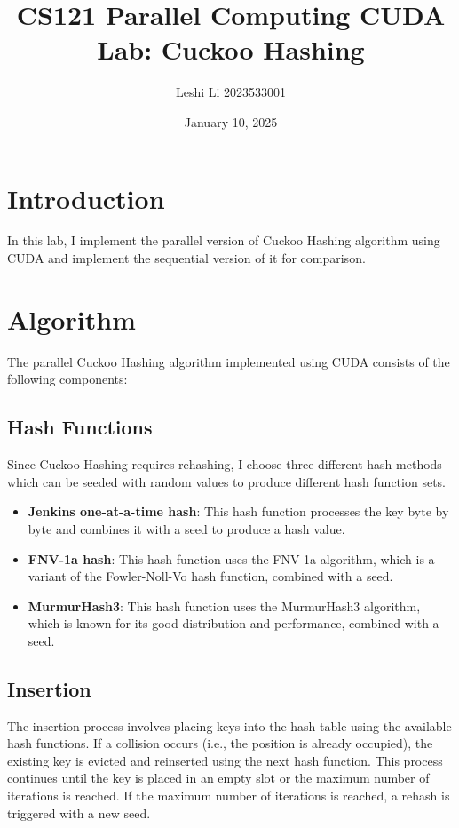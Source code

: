 \documentclass{article}
\title{CS121 Parallel Computing CUDA Lab: Cuckoo Hashing}
\author{Leshi Li 2023533001}
\date{January 10, 2025}
\begin{document}
\maketitle

\section{Introduction}

In this lab, I implement the parallel version of Cuckoo Hashing algorithm using CUDA and implement the sequential version of it for comparison.

\section{Algorithm}

The parallel Cuckoo Hashing algorithm implemented using CUDA consists of the following components:

\subsection{Hash Functions}
Since Cuckoo Hashing requires rehashing, I choose three different hash methods which can be seeded with random values to produce different hash function sets.
\begin{itemize}
    \item \textbf{Jenkins one-at-a-time hash}: This hash function processes the key byte by byte and combines it with a seed to produce a hash value.
    \item \textbf{FNV-1a hash}: This hash function uses the FNV-1a algorithm, which is a variant of the Fowler-Noll-Vo hash function, combined with a seed.
    \item \textbf{MurmurHash3}: This hash function uses the MurmurHash3 algorithm, which is known for its good distribution and performance, combined with a seed.
\end{itemize}

\subsection{Insertion}
The insertion process involves placing keys into the hash table using the available hash functions. If a collision occurs (i.e., the position is already occupied), the existing key is evicted and reinserted using the next hash function. This process continues until the key is placed in an empty slot or the maximum number of iterations is reached. If the maximum number of iterations is reached, a rehash is triggered with a new seed.
\end{document}
